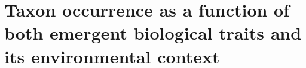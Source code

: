\documentclass{beamer}
\begin{document}


\section{Taxon occurrence as a function of both emergent biological traits and its environmental context}




\end{document}
